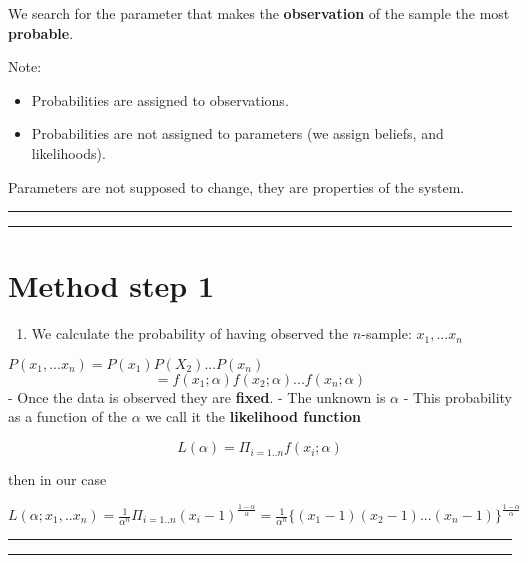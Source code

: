 \documentclass[
]{book}
\providecommand{\tightlist}{%
  \setlength{\itemsep}{0pt}\setlength{\parskip}{0pt}}
\begin{document}
We search for the parameter that makes the \textbf{observation} of the sample the most \textbf{probable}.

Note:

\begin{itemize}
\tightlist
\item
  Probabilities are assigned to observations.
\item
  Probabilities are not assigned to parameters (we assign beliefs, and likelihoods).
\end{itemize}

Parameters are not supposed to change, they are properties of the system.

\begin{center}\rule{0.5\linewidth}{0.5pt}\end{center}

\begin{center}\rule{0.5\linewidth}{0.5pt}\end{center}

\hypertarget{method-step-1}{%
\section{Method step 1}\label{method-step-1}}

\begin{enumerate}
\def\labelenumi{\arabic{enumi}.}
\tightlist
\item
  We calculate the probability of having observed the \(n\)-sample: \(x_1,...x_n\)
\end{enumerate}

\(P(x_1,...x_n)=P(x_1)P(X_2)...P(x_n)\)
\[=f(x_1;\alpha)f(x_2;\alpha) ...f(x_n;\alpha)\]
- Once the data is observed they are \textbf{fixed}.
- The unknown is \(\alpha\)
- This probability as a function of the \(\alpha\) we call it the \textbf{likelihood function}

\[L(\alpha)= \Pi_{i=1..n} f(x_i; \alpha)\]

then in our case

\(L(\alpha;x_1,..x_n)= \frac{1}{\alpha^n} \Pi_{i=1..n} (x_i-1)^{\frac{1-\alpha}{\alpha}}= \frac{1}{\alpha^n} \{(x_1-1)(x_2-1)...(x_n-1)\}^{\frac{1-\alpha}{\alpha}}\)

\begin{center}\rule{0.5\linewidth}{0.5pt}\end{center}

\begin{center}\rule{0.5\linewidth}{0.5pt}\end{center}
\end{document}
